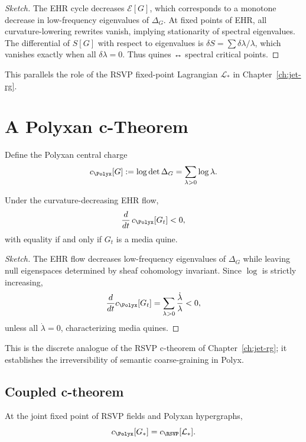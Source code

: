 \begin{proof}[Sketch]
The EHR cycle decreases $\mathcal{E}[G]$, which corresponds to a monotone
decrease in low-frequency eigenvalues of $\Delta_G$.  
At fixed points of EHR, all curvature-lowering rewrites vanish, implying
stationarity of spectral eigenvalues.  
The differential of $S[G]$ with respect to eigenvalues is
$\delta S = \sum \delta\lambda/\lambda$, which vanishes exactly when all
$\delta\lambda = 0$.  
Thus quines ↔ spectral critical points.
\end{proof}

This parallels the role of the RSVP fixed-point Lagrangian $\mathcal{L}_\ast$ in
Chapter~\ref{ch:jet-rg}.

\section{A Polyxan c-Theorem}

Define the Polyxan central charge
\[
c_{\Polyx}[G] := \log \det \Delta_G
= \sum_{\lambda>0} \log \lambda.
\]

\begin{theorem}
Under the curvature-decreasing EHR flow,
\[
\frac{d}{dt}\, c_{\Polyx}[G_t] < 0,
\]
with equality if and only if $G_t$ is a media quine.
\end{theorem}

\begin{proof}[Sketch]
The EHR flow decreases low-frequency eigenvalues of $\Delta_G$ while leaving
null eigenspaces determined by sheaf cohomology invariant.  
Since $\log$ is strictly increasing,
\[
\frac{d}{dt} c_{\Polyx}[G_t]
= \sum_{\lambda>0} \frac{\dot{\lambda}}{\lambda}
< 0,
\]
unless all $\dot{\lambda}=0$, characterizing media quines.
\end{proof}

This is the discrete analogue of the RSVP c-theorem of
Chapter~\ref{ch:jet-rg}; it establishes the irreversibility of semantic
coarse-graining in Polyx.

\subsection{Coupled c-theorem}

\begin{theorem}
At the joint fixed point of RSVP fields and Polyxan hypergraphs,
\[
c_{\Polyx}[G_\ast] = c_{\RSVP}[\mathcal{L}_\ast].
\]
\end{theorem}

